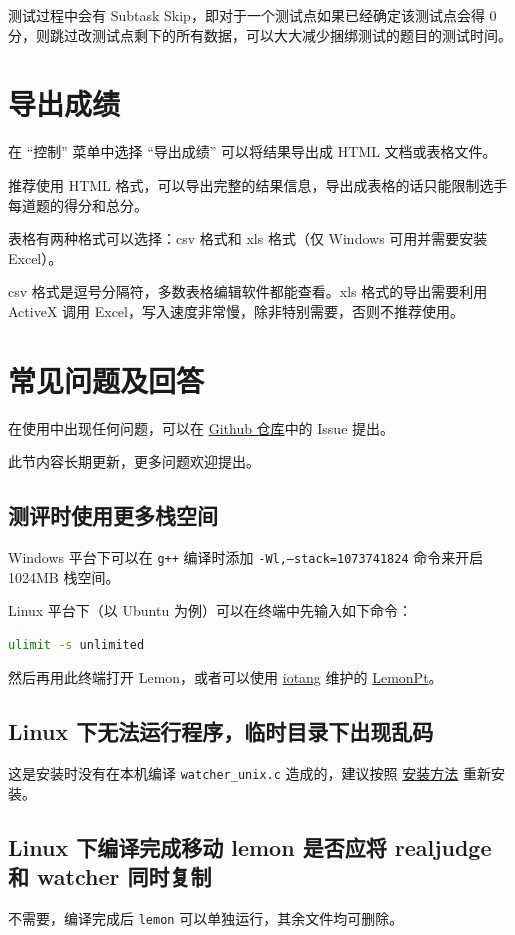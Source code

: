 \documentclass[12pt, a4paper]{article}
\begin{document}
测试过程中会有 Subtask Skip，即对于一个测试点如果已经确定该测试点会得 0 分，则跳过改测试点剩下的所有数据，可以大大减少捆绑测试的题目的测试时间。

\section{导出成绩}
在 “控制” 菜单中选择 “导出成绩” 可以将结果导出成 HTML 文档或表格文件。

推荐使用 HTML 格式，可以导出完整的结果信息，导出成表格的话只能限制选手每道题的得分和总分。

表格有两种格式可以选择：csv 格式和 xls 格式（仅 Windows 可用并需要安装 Excel）。

csv 格式是逗号分隔符，多数表格编辑软件都能查看。xls 格式的导出需要利用 ActiveX 调用 Excel，写入速度非常慢，除非特别需要，否则不推荐使用。

\section{常见问题及回答}
在使用中出现任何问题，可以在 \href{https://github.com/Dust1404/Project_LemonPlus}{Github 仓库}中的 Issue 提出。

此节内容长期更新，更多问题欢迎提出。

\subsection{测评时使用更多栈空间}
Windows 平台下可以在 \texttt{g++} 编译时添加 \texttt{-Wl,--stack=1073741824} 命令来开启 1024MB 栈空间。

Linux 平台下（以 Ubuntu 为例）可以在终端中先输入如下命令：
\begin{lstlisting}[language=bash,frame=shadowbox,basicstyle=\ttfamily]
ulimit -s unlimited
\end{lstlisting}

然后再用此终端打开 Lemon，或者可以使用 \href{https://github.com/iotang}{iotang} 维护的 \href{https://github.com/iotang/Project_LemonPt}{LemonPt}。

\subsection{Linux 下无法运行程序，临时目录下出现乱码}
这是安装时没有在本机编译 \texttt{watcher\_unix.c} 造成的，建议按照 \hyperref[linux install]{安装方法} 重新安装。

\subsection{Linux 下编译完成移动 lemon 是否应将 realjudge 和 watcher 同时复制}
不需要，编译完成后 \texttt{lemon} 可以单独运行，其余文件均可删除。
\end{document}
